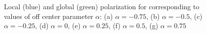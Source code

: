 \documentclass[../../master_thesis_np.tex]{subfiles}
\begin{document}
		\begin{figure}[t]
			\ContinuedFloat
			\centering
			
			
			\caption{Local (blue) and global (green) polarization for corresponding to values of off center parameter $\alpha$: (a) $\alpha = -0.75$, (b) $\alpha = -0.5$, (c) $\alpha = -0.25$, (d) $\alpha = 0$, (e) $\alpha = 0.25$, (f) $\alpha = 0.5$, (g) $\alpha = 0.75$}
			\label{fig:lj_oc_pol}
		\end{figure}
		
\end{document}
